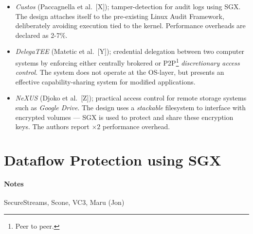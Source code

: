 \begin{itemize}
    \item \textit{Custos} (Paccagnella et al.~[X]); tamper-detection for audit logs using SGX. The design attaches itself to the pre-existing Linux Audit Framework, deliberately avoiding execution tied to the kernel. Performance overheads are declared as 2-7\%. 
    \item \textit{DelegaTEE} (Matetic et al.~[Y]); credential delegation between two computer systems by enforcing either centrally brokered or P2P\footnote{Peer to peer.} \textit{discretionary access control}. The system does not operate at the OS-layer, but presents an effective capability-sharing system for modified applications.
    \item \textit{NeXUS} (Djoko et al.~[Z]); practical access control for remote storage systems such as \textit{Google Drive}. The design uses a \textit{stackable} filesystem to interface with encrypted volumes --- SGX is used to protect and share these encryption keys. The authors report $\times 2$ performance overhead.
\end{itemize}


\section{Dataflow Protection using SGX}




\paragraph{Notes} SecureStreams, Scone, VC3, Maru (Jon)

